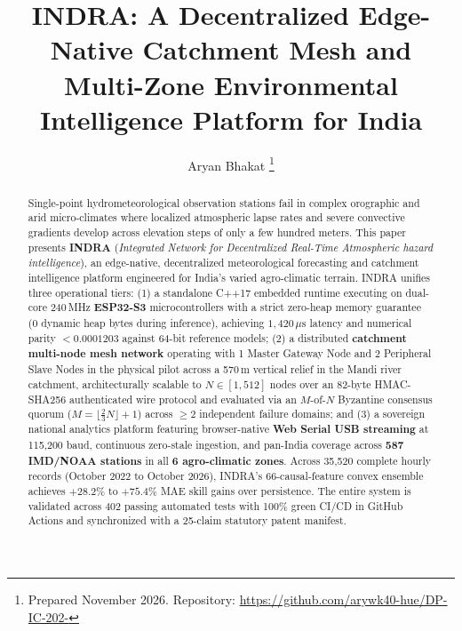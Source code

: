 \documentclass[journal,a4paper]{IEEEtran}
\begin{document}
\title{INDRA: A Decentralized Edge-Native Catchment Mesh and Multi-Zone Environmental Intelligence Platform for India}

\author{Aryan Bhakat%
\thanks{Prepared November 2026. Repository: \url{https://github.com/arywk40-hue/DP-IC-202-}}}


\maketitle

\begin{abstract}
Single-point hydrometeorological observation stations fail in complex orographic and arid micro-climates where localized atmospheric lapse rates and severe convective gradients develop across elevation steps of only a few hundred meters. This paper presents \textbf{INDRA} (\textit{Integrated Network for Decentralized Real-Time Atmospheric hazard intelligence}), an edge-native, decentralized meteorological forecasting and catchment intelligence platform engineered for India's varied agro-climatic terrain. INDRA unifies three operational tiers: (1) a standalone C++17 embedded runtime executing on dual-core 240\,MHz \textbf{ESP32-S3} microcontrollers with a strict zero-heap memory guarantee (0 dynamic heap bytes during inference), achieving $1,420\,\mu\text{s}$ latency and numerical parity $< 0.0001203$ against 64-bit reference models; (2) a distributed \textbf{catchment multi-node mesh network} operating with 1 Master Gateway Node and 2 Peripheral Slave Nodes in the physical pilot across a 570\,m vertical relief in the Mandi river catchment, architecturally scalable to $N \in [1, 512]$ nodes over an 82-byte HMAC-SHA256 authenticated wire protocol and evaluated via an $M$-of-$N$ Byzantine consensus quorum ($M = \lfloor \frac{2}{3} N \rfloor + 1$) across $\ge 2$ independent failure domains; and (3) a sovereign national analytics platform featuring browser-native \textbf{Web Serial USB streaming} at 115,200 baud, continuous zero-stale ingestion, and pan-India coverage across \textbf{587 IMD/NOAA stations} in all \textbf{6 agro-climatic zones}. Across 35{,}520 complete hourly records (October 2022 to October 2026), INDRA's 66-causal-feature convex ensemble achieves $+28.2\%$ to $+75.4\%$ MAE skill gains over persistence. The entire system is validated across 402 passing automated tests with 100\% green CI/CD in GitHub Actions and synchronized with a 25-claim statutory patent manifest.
\end{abstract}
\end{document}
